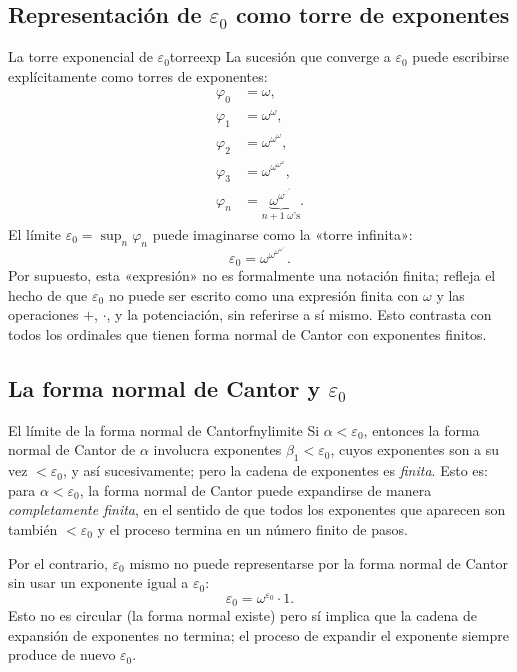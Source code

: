 \subsection{Representación de $\varepsilon_0$ como torre de exponentes}

\begin{ejemplo}{La torre exponencial de $\varepsilon_0$}{torreexp}
La sucesión que converge a $\varepsilon_0$ puede escribirse explícitamente como torres de exponentes:
\begin{align*}
  \varphi_0 &= \omega, \\
  \varphi_1 &= \omega^\omega, \\
  \varphi_2 &= \omega^{\omega^\omega}, \\
  \varphi_3 &= \omega^{\omega^{\omega^\omega}}, \\
  \varphi_n &= \underbrace{\omega^{\omega^{\cdot^{\cdot^{\cdot^\omega}}}}}_{n+1\;\omega\text{'s}}.
\end{align*}
El límite $\varepsilon_0 = \sup_n \varphi_n$ puede imaginarse como la «torre infinita»:
\[
  \varepsilon_0 = \omega^{\omega^{\omega^{\omega^{\cdots}}}}.
\]
Por supuesto, esta «expresión» no es formalmente una notación finita; refleja el hecho de que $\varepsilon_0$ no puede ser escrito como una expresión finita con $\omega$ y las operaciones $+$, $\cdot$, y la potenciación, sin referirse a sí mismo. Esto contrasta con todos los ordinales que tienen forma normal de Cantor con exponentes finitos.
\end{ejemplo}

\subsection{La forma normal de Cantor y $\varepsilon_0$}

\begin{observacion}{El límite de la forma normal de Cantor}{fnylimite}
Si $\alpha < \varepsilon_0$, entonces la forma normal de Cantor de $\alpha$ involucra exponentes $\beta_1 < \varepsilon_0$, cuyos exponentes son a su vez $< \varepsilon_0$, y así sucesivamente; pero la cadena de exponentes es \emph{finita}. Esto es: para $\alpha < \varepsilon_0$, la forma normal de Cantor puede expandirse de manera \emph{completamente finita}, en el sentido de que todos los exponentes que aparecen son también $<\varepsilon_0$ y el proceso termina en un número finito de pasos.

Por el contrario, $\varepsilon_0$ mismo no puede representarse por la forma normal de Cantor sin usar un exponente igual a $\varepsilon_0$:
\[
  \varepsilon_0 = \omega^{\varepsilon_0} \cdot 1.
\]
Esto no es circular (la forma normal existe) pero sí implica que la cadena de expansión de exponentes no termina; el proceso de expandir el exponente siempre produce de nuevo $\varepsilon_0$.
\end{observacion}

